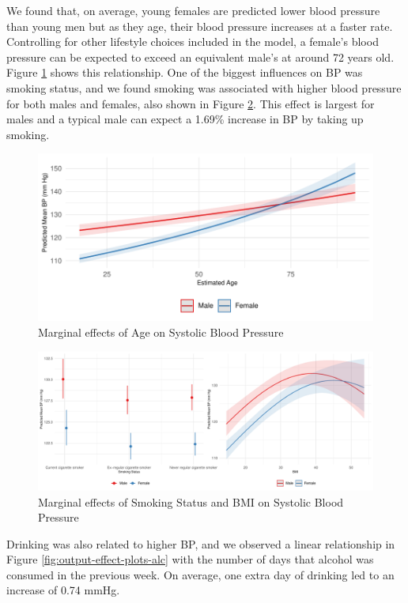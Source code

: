 \documentclass[
  11pt,
  twocolumn]{article}
\begin{document}
We found that, on average, young females are predicted lower blood
pressure than young men but as they age, their blood pressure increases
at a faster rate. Controlling for other lifestyle choices included in
the model, a female's blood pressure can be expected to exceed an
equivalent male's at around 72 years old. Figure
\ref{fig:output-effect-plots-age} shows this relationship. One of the
biggest influences on BP was smoking status, and we found smoking was
associated with higher blood pressure for both males and females, also
shown in Figure \ref{fig:output-effect-plots}. This effect is largest
for males and a typical male can expect a 1.69\% increase in BP by
taking up smoking.

\begin{figure}[H]
\includegraphics{Coursework_files/figure-latex/output-effect-plots-age-1} \caption{Marginal effects of Age on Systolic Blood Pressure}\label{fig:output-effect-plots-age}
\end{figure}

\begin{figure}[H]
\includegraphics{Coursework_files/figure-latex/output-effect-plots-1} \caption{Marginal effects of Smoking Status and BMI on Systolic Blood Pressure}\label{fig:output-effect-plots}
\end{figure}

Drinking was also related to higher BP, and we observed a linear
relationship in Figure \ref{fig:output-effect-plots-alc} with the number
of days that alcohol was consumed in the previous week. On average, one
extra day of drinking led to an increase of 0.74 mmHg.
\end{document}
